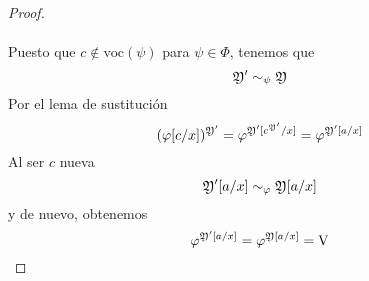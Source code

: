 \begin{proof}
\paragraph{}
Puesto que $c \not \in \mbox{voc}(\psi)$ para $\psi \in \Phi$, tenemos que 
\[ \mathfrak{Y}' \sim_{\psi} \mathfrak{Y} \]
Por el lema de sustitución 
\[ (\varphi[c/x])^{\mathfrak{Y}'}= \varphi^{\mathfrak{Y}'[c^{\mathfrak{Y}'}/x]}=\varphi^{\mathfrak{Y}'[a/x]} \]
Al ser $c$ nueva 
\[ \mathfrak{Y}'[a/x] \sim_{\varphi} \mathfrak{Y}[a/x] \]
y de nuevo, obtenemos 
 \[ \varphi^{\mathfrak{Y}'[a/x]}= \varphi^{\mathfrak{Y}[a/x]}=\mbox{V} \]
\end{proof}